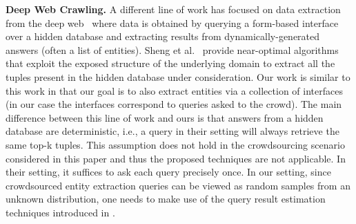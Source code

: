\vspace{3pt}\noindent\textbf{Deep Web Crawling.} A different line of work has focused on data extraction from the deep web~\cite{Jin:2011,Sheng:2012} where data is obtained by querying a form-based interface over a hidden database and extracting results from dynamically-generated answers (often a list of entities). Sheng et al.~\cite{Sheng:2012} provide near-optimal algorithms that exploit the exposed structure of the underlying domain to extract all the tuples present in the hidden database under consideration. Our work is similar to this work in that our goal is to also extract entities via a collection of interfaces (in our case the interfaces correspond to queries asked to the crowd). The main difference between this line of work and ours is that answers from a hidden database are deterministic, i.e., a query in their setting will always retrieve the same top-k tuples. This assumption does not hold in the crowdsourcing scenario considered in this paper and thus the proposed techniques are not applicable. In their setting, it suffices to ask each query precisely once. In our setting, since crowdsourced entity extraction queries can be viewed as random samples from an unknown  distribution, one needs to make use of the query result estimation techniques introduced in .